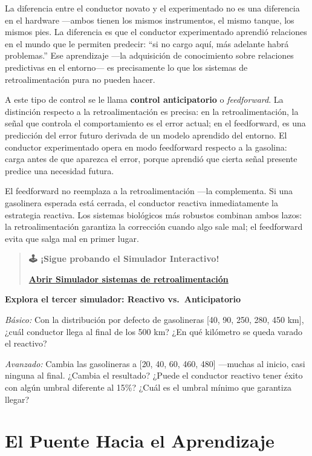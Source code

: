 \documentclass[
  letterpaper,
  DIV=11,
  numbers=noendperiod]{scrreprt}
\begin{document}
\begin{tcolorbox}[enhanced jigsaw, toprule=.15mm, arc=.35mm, colback=white, opacityback=0, colframe=quarto-callout-note-color-frame, breakable, rightrule=.15mm, left=2mm, leftrule=.75mm, bottomrule=.15mm]
La diferencia entre el conductor novato y el experimentado no es una
diferencia en el hardware ---ambos tienen los mismos instrumentos, el
mismo tanque, los mismos pies. La diferencia es que el conductor
experimentado aprendió relaciones en el mundo que le permiten predecir:
``si no cargo aquí, más adelante habrá problemas.'' Ese aprendizaje
---la adquisición de conocimiento sobre relaciones predictivas en el
entorno--- es precisamente lo que los sistemas de retroalimentación pura
no pueden hacer.

A este tipo de control se le llama \textbf{control anticipatorio} o
\emph{feedforward}. La distinción respecto a la retroalimentación es
precisa: en la retroalimentación, la señal que controla el
comportamiento es el error actual; en el feedforward, es una predicción
del error futuro derivada de un modelo aprendido del entorno. El
conductor experimentado opera en modo feedforward respecto a la
gasolina: carga antes de que aparezca el error, porque aprendió que
cierta señal presente predice una necesidad futura.

El feedforward no reemplaza a la retroalimentación ---la complementa. Si
una gasolinera esperada está cerrada, el conductor reactiva
inmediatamente la estrategia reactiva. Los sistemas biológicos más
robustos combinan ambos lazos: la retroalimentación garantiza la
corrección cuando algo sale mal; el feedforward evita que salga mal en
primer lugar.

\begin{quote}
\textbf{🕹️ ¡Sigue probando el Simulador Interactivo!}

\href{https://colab.research.google.com/github/arbouria/Libro-ACA-2026/blob/main/Simuladores/retroalimentacion.ipynb}{\textbf{Abrir
Simulador sistemas de retroalimentación}}
\end{quote}

\textbf{Explora el tercer simulador: Reactivo vs.~Anticipatorio}

\emph{Básico:} Con la distribución por defecto de gasolineras {[}40, 90,
250, 280, 450 km{]}, ¿cuál conductor llega al final de los 500 km? ¿En
qué kilómetro se queda varado el reactivo?

\emph{Avanzado:} Cambia las gasolineras a {[}20, 40, 60, 460, 480{]}
---muchas al inicio, casi ninguna al final. ¿Cambia el resultado? ¿Puede
el conductor reactivo tener éxito con algún umbral diferente al 15\%?
¿Cuál es el umbral mínimo que garantiza llegar?

\section{El Puente Hacia el
Aprendizaje}\label{el-puente-hacia-el-aprendizaje}


\end{tcolorbox}
\end{document}
